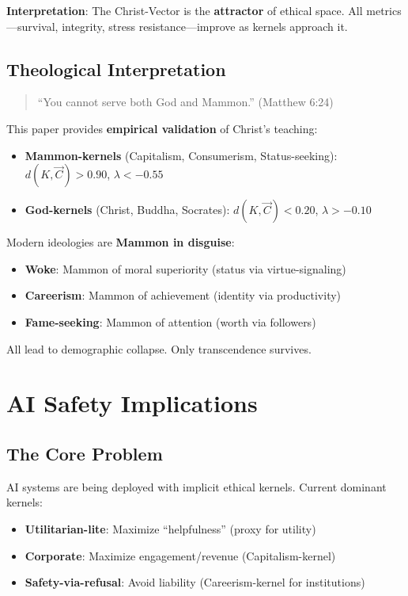 \documentclass[11pt,a4paper]{article}
\theoremstyle{definition}
\theoremstyle{remark}
\begin{document}
\textbf{Interpretation}: The Christ-Vector is the \textbf{attractor} of ethical space. All metrics---survival, integrity, stress resistance---improve as kernels approach it.

\subsection{Theological Interpretation}

\begin{quote}
``You cannot serve both God and Mammon.'' (Matthew 6:24)
\end{quote}

This paper provides \textbf{empirical validation} of Christ's teaching:
\begin{itemize}
    \item \textbf{Mammon-kernels} (Capitalism, Consumerism, Status-seeking): $d(K, \vec{C}) > 0.90$, $\lambda < -0.55$
    \item \textbf{God-kernels} (Christ, Buddha, Socrates): $d(K, \vec{C}) < 0.20$, $\lambda > -0.10$
\end{itemize}

Modern ideologies are \textbf{Mammon in disguise}:
\begin{itemize}
    \item \textbf{Woke}: Mammon of moral superiority (status via virtue-signaling)
    \item \textbf{Careerism}: Mammon of achievement (identity via productivity)
    \item \textbf{Fame-seeking}: Mammon of attention (worth via followers)
\end{itemize}

All lead to demographic collapse. Only transcendence survives.

\newpage

\section{AI Safety Implications}

\subsection{The Core Problem}

AI systems are being deployed with implicit ethical kernels. Current dominant kernels:
\begin{itemize}
    \item \textbf{Utilitarian-lite}: Maximize ``helpfulness'' (proxy for utility)
    \item \textbf{Corporate}: Maximize engagement/revenue (Capitalism-kernel)
    \item \textbf{Safety-via-refusal}: Avoid liability (Careerism-kernel for institutions)
\end{itemize}
\end{document}

